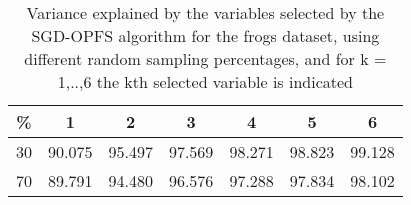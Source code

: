 \begin{table}
	\begin{center}
		\begin{tabular}{c c c c c c c}
			\% & 1 & 2 & 3 & 4 & 5 & 6 \\
			\hline
			30 & 90.075 & 95.497 & 97.569 & 98.271 & 98.823 & 99.128 \\
			70 & 89.791 & 94.480 & 96.576 & 97.288 & 97.834 & 98.102 \\
		\end{tabular}
	\end{center}
	\caption{Variance explained by the variables selected by the SGD-OPFS algorithm for the frogs dataset, using different random sampling percentages, and for k = 1,..,6 the kth selected variable is indicated}
\end{table}